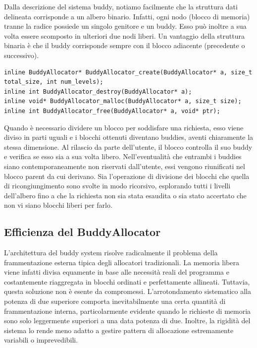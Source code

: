 Dalla descrizione del sistema buddy, notiamo facilmente che la struttura dati delineata corrisponde a un albero binario. Infatti, ogni nodo (blocco di memoria) tranne la radice possiede un singolo genitore e un buddy. Esso può inoltre a sua volta essere scomposto in ulteriori due nodi liberi. Un vantaggio della struttura binaria è che il buddy corrisponde sempre con il blocco adiacente (precedente o successivo).

\begin{lstlisting}
inline BuddyAllocator* BuddyAllocator_create(BuddyAllocator* a, size_t total_size, int num_levels);
inline int BuddyAllocator_destroy(BuddyAllocator* a);
inline void* BuddyAllocator_malloc(BuddyAllocator* a, size_t size);
inline int BuddyAllocator_free(BuddyAllocator* a, void* ptr);
\end{lstlisting}

Quando è necessario dividere un blocco per soddisfare una richiesta, esso viene diviso in parti uguali e i blocchi ottenuti diventano buddies, aventi chiaramente la stessa dimensione. Al rilascio da parte dell’utente, il blocco controlla il suo buddy e verifica se esso sia a sua volta libero. Nell’eventualità che entrambi i buddies siano contemporaneamente non riservati dall’utente, essi vengono riunificati nel blocco parent da cui derivano. Sia l'operazione di divisione dei blocchi che quella di ricongiungimento sono svolte in modo ricorsivo, esplorando tutti i livelli dell'albero fino a che la richiesta non sia stata esaudita o sia stato accertato che non vi siano blocchi liberi per farlo. 

\subsection*{Efficienza del BuddyAllocator}
L’architettura del buddy system risolve radicalmente il problema della frammentazione esterna tipica degli allocatori tradizionali. La memoria libera viene infatti divisa equamente in base alle necessità reali del programma e costantemente riaggregata in blocchi ordinati e perfettamente allineati. Tuttavia, questa soluzione non è esente da compromessi. L'arrotondamento sistematico alla potenza di due superiore comporta inevitabilmente una certa quantità di frammentazione interna, particolarmente evidente quando le richieste di memoria sono solo leggermente superiori a una data potenza di due. Inoltre, la rigidità del sistema lo rende meno adatto a gestire pattern di allocazione estremamente variabili o imprevedibili.

